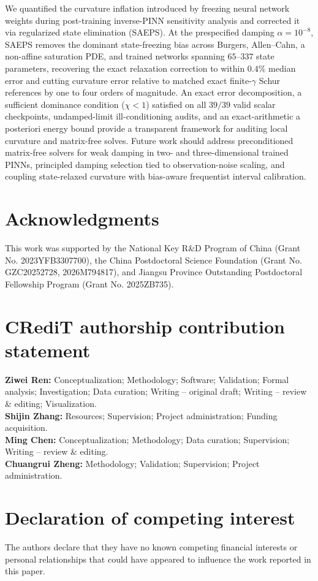 \documentclass[preprint,11pt]{elsarticle}
\begin{document}
We quantified the curvature inflation introduced by freezing neural network weights during post-training inverse-PINN sensitivity analysis and corrected it via regularized state elimination (SAEPS).
At the prespecified damping $\alpha=10^{-8}$, SAEPS removes the dominant state-freezing bias across Burgers, Allen--Cahn, a non-affine saturation PDE, and trained networks spanning $65$--$337$ state parameters, recovering the exact relaxation correction to within $0.4\%$ median error and cutting curvature error relative to matched exact finite-$\gamma$ Schur references by one to four orders of magnitude.
An exact error decomposition, a sufficient dominance condition ($\chi<1$) satisfied on all $39/39$ valid scalar checkpoints, undamped-limit ill-conditioning audits, and an exact-arithmetic a posteriori energy bound provide a transparent framework for auditing local curvature and matrix-free solves.
Future work should address preconditioned matrix-free solvers for weak damping in two- and three-dimensional trained PINNs, principled damping selection tied to observation-noise scaling, and coupling state-relaxed curvature with bias-aware frequentist interval calibration.

\section*{Acknowledgments}
This work was supported by the National Key R\&D Program of China (Grant No. 2023YFB3307700), the China Postdoctoral Science Foundation (Grant No. GZC20252728, 2026M794817), and Jiangsu Province Outstanding Postdoctoral Fellowship Program (Grant No. 2025ZB735).

\section*{CRediT authorship contribution statement}
\noindent\textbf{Ziwei Ren:} Conceptualization; Methodology; Software; Validation; Formal analysis; Investigation; Data curation; Writing -- original draft; Writing -- review \& editing; Visualization.\\
\textbf{Shijin Zhang:} Resources; Supervision; Project administration; Funding acquisition.\\
\textbf{Ming Chen:} Conceptualization; Methodology; Data curation; Supervision; Writing -- review \& editing.\\
\textbf{Chuangrui Zheng:} Methodology; Validation; Supervision; Project administration.

\section*{Declaration of competing interest}
The authors declare that they have no known competing financial interests or personal relationships that could have appeared to influence the work reported in this paper.
\end{document}
